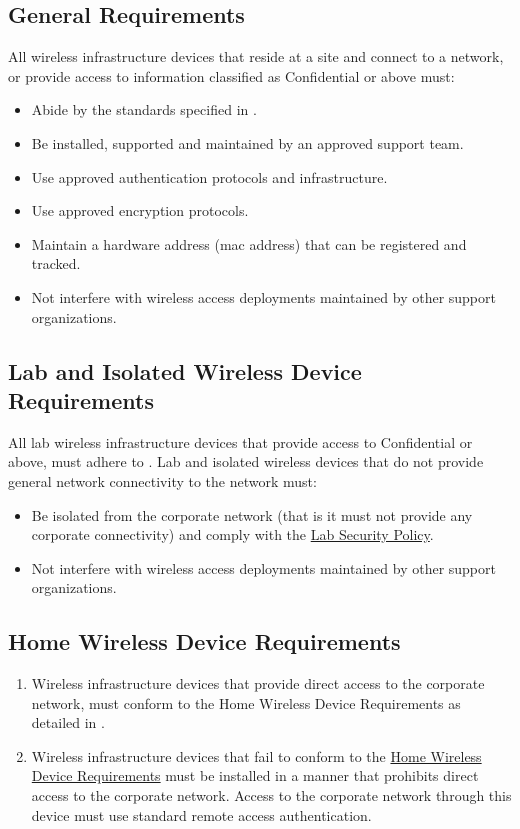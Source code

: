 \subsection{General Requirements}\label{NS:WCP:Po:GR}
All wireless infrastructure devices that reside at a \CompanyName{} site and connect to a \CompanyName{} network, or provide access to information classified as \CompanyName{} Confidential\del{,} or above\ins{,} must: 
\begin{itemize}
\item
Abide by the standards specified in . 
\item
Be installed, supported\oxford{} and maintained by an approved support team.
\item
Use \CompanyName{} approved authentication protocols and infrastructure.
\item
Use \CompanyName{} approved encryption protocols.
\item
Maintain a hardware address (\gls{mac} address) that can be registered and tracked. 
\item
Not interfere with wireless access deployments maintained by other support organizations.
\end{itemize}
\subsection{Lab and Isolated Wireless Device Requirements}
All lab wireless infrastructure devices that provide access to \CompanyName{} Confidential or above, must adhere to .  
Lab and isolated wireless devices that do not provide general network connectivity to the \CompanyName{} network must: 
\begin{itemize}
\item
Be isolated from the corporate network (that is\ins{,} it must not provide any corporate connectivity) and comply with the \hyperref[SS:LSP]{Lab Security Policy}.
\item
Not interfere with wireless access deployments maintained by other support organizations. 
\end{itemize}
\subsection{Home Wireless Device Requirements}\label{NS:WCP:Po:HWDR}
\begin{enumerate}
\item
Wireless infrastructure devices that provide direct access to the \CompanyName{} corporate network, must conform to the Home Wireless Device Requirements as detailed in .
\item
Wireless infrastructure devices that fail to conform to the \hyperref[NS:WCP:Po:HWDR]{Home Wireless Device Requirements} must be installed in a manner that prohibits direct access to the \CompanyName{} corporate network.  
Access to the \CompanyName{} corporate network through this device must use standard remote access authentication.
\end{enumerate}
\CommonPolicyCompliance

